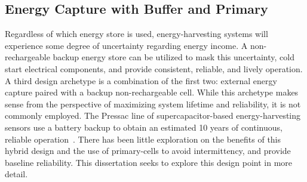 \subsection{Energy Capture with Buffer and Primary}

Regardless of which energy store is used, energy-harvesting systems will
experience some degree of uncertainty regarding energy income.
A non-rechargeable
backup energy store can be utilized to mask this uncertainty, cold
start electrical components, and provide consistent, reliable, and lively operation.
A third design archetype is a combination of the first two:
external energy capture paired with a backup non-rechargeable cell.
While this archetype makes sense from the perspective of maximizing system lifetime and reliability, it is not commonly employed.
The Pressac line of supercapacitor-based energy-harvesting sensors
use a battery backup to obtain an estimated 10 years of continuous, reliable operation~\cite{pressac}.
There has been little
exploration on the benefits of this hybrid design and the use of
primary-cells to avoid intermittency,
and provide baseline reliability. This dissertation seeks to explore this design point in more detail.




